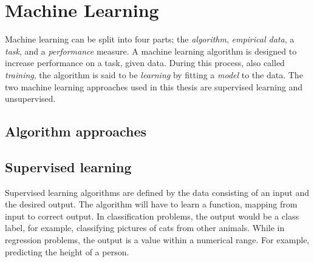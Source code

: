 





\section{Machine Learning} \label{Machine Learning}
    Machine learning can be split into four parts; the \textit{algorithm}, \textit{empirical data}, a \textit{task}, and a \textit{performance} measure\cite{Goodfellow-et-al-2016}. A machine learning algorithm is designed to increase performance on a task, given data. During this process, also called \textit{training}, the algorithm is said to be \textit{learning} by fitting a \textit{model} to the data. The two machine learning approaches used in this thesis are supervised learning and unsupervised\cite{Goodfellow-et-al-2016}. 
    
    \subsection{Algorithm approaches} \label{Algorithm types}
        \subsection{Supervised learning}
            Supervised learning  algorithms are defined by the data consisting of an input and the desired output\cite{Goodfellow-et-al-2016}. The algorithm will have to learn a function, mapping from input to correct output. In classification problems, the output would be a class label, for example, classifying pictures of cats from other animals. While in regression problems, the output is a value within a numerical range. For example, predicting the height of a person.
            
